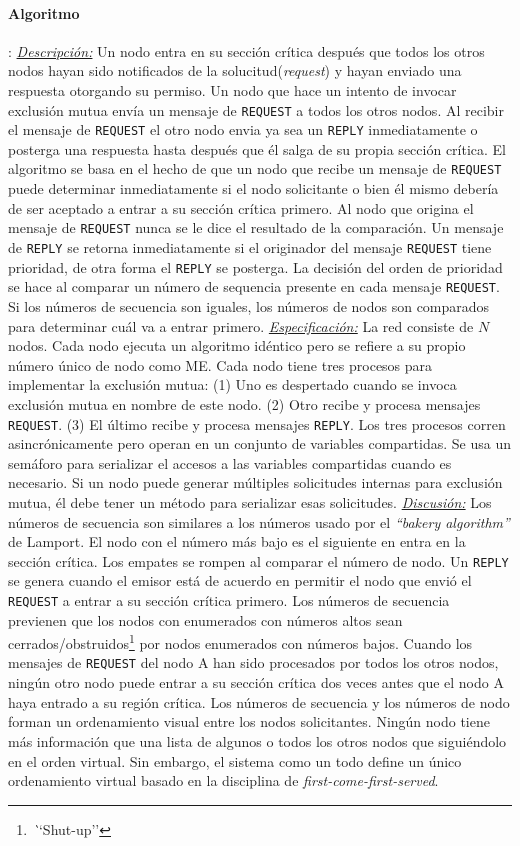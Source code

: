 \paragraph{\textnormal{\textbf{Algoritmo}}}: 
\underline{\emph{Descripción:}} Un nodo entra en su sección crítica después que todos los otros nodos hayan sido notificados de la solucitud(\emph{request}) y hayan enviado una respuesta otorgando su permiso. Un nodo que hace un intento de invocar exclusión mutua envía un mensaje de \texttt{REQUEST} a todos los otros nodos. Al recibir el mensaje de \texttt{REQUEST} el otro nodo envia ya sea un \texttt{REPLY} inmediatamente o posterga una respuesta hasta después que él salga de su propia sección crítica. El algoritmo se basa en el hecho de que un nodo que recibe un mensaje de \texttt{REQUEST} puede determinar inmediatamente si el nodo solicitante o bien él mismo debería de ser aceptado a entrar a su sección crítica primero. Al nodo que origina el mensaje de \texttt{REQUEST} nunca se le dice el resultado de la comparación. Un mensaje de \texttt{REPLY} se retorna inmediatamente si el originador del mensaje \texttt{REQUEST} tiene prioridad, de otra forma el \texttt{REPLY} se posterga. La decisión del orden de prioridad se hace al comparar un número de sequencia presente en cada mensaje \texttt{REQUEST}. Si los números de secuencia son iguales, los números de nodos son comparados para determinar cuál va a entrar primero. \underline{\emph{Especificación:}} La red consiste de $N$ nodos. Cada nodo ejecuta un algoritmo idéntico pero se refiere a su propio número único de nodo como ME. Cada nodo tiene tres procesos para implementar la exclusión mutua: (1) Uno es despertado cuando se invoca exclusión mutua en nombre de este nodo. (2) Otro recibe y procesa mensajes \texttt{REQUEST}. (3) El último recibe y procesa mensajes \texttt{REPLY}. Los tres procesos corren asincrónicamente pero operan en un conjunto de variables compartidas. Se usa un semáforo para serializar el accesos a las variables compartidas cuando es necesario. Si un nodo puede generar múltiples solicitudes internas para exclusión mutua, él debe tener un método para serializar esas solicitudes. \underline{\emph{Discusión:}} Los números de secuencia son similares a los números usado por el \emph{``bakery algorithm''} de Lamport. El nodo con el número más bajo es el siguiente en entra en la sección crítica. Los empates se rompen al comparar el número de nodo. Un \texttt{REPLY} se genera cuando el emisor está de acuerdo en permitir el nodo que envió el \texttt{REQUEST} a entrar a su sección crítica primero. Los números de secuencia previenen que los nodos con enumerados con números altos sean cerrados/obstruidos\footnote{\emph``Shut-up''} por nodos enumerados con números bajos. Cuando los mensajes de \texttt{REQUEST} del nodo A han sido procesados por todos los otros nodos, ningún otro nodo puede entrar a su sección crítica dos veces antes que el nodo A haya entrado a su región crítica. Los números de secuencia y los números de nodo forman un ordenamiento visual entre los nodos solicitantes. Ningún nodo tiene más información que una lista de algunos o todos los otros nodos que siguiéndolo en el orden virtual. Sin embargo, el sistema como un todo define un único ordenamiento virtual basado en la disciplina de \emph{first-come-first-served}.

